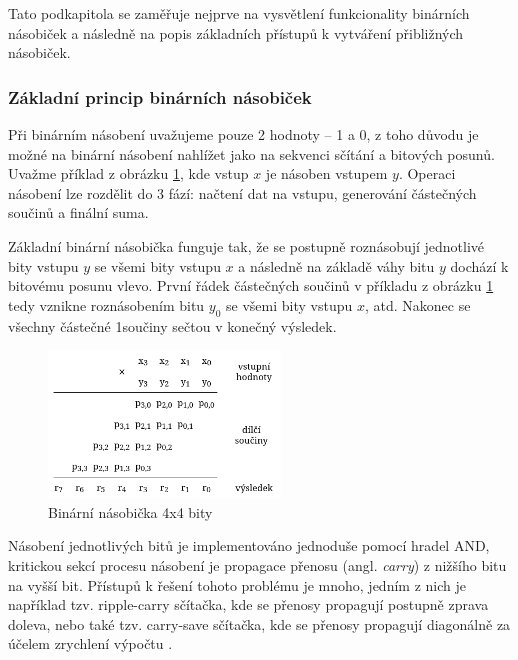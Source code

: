 Tato podkapitola se zaměřuje nejprve na vysvětlení funkcionality binárních násobiček a následně na popis základních přístupů k vytváření přibližných násobiček.

\subsubsection{Základní princip binárních násobiček}
Při binárním násobení uvažujeme pouze 2 hodnoty -- 1 a 0, z toho důvodu je možné na binární násobení nahlížet jako na sekvenci sčítání a bitových posunů. Uvažme příklad z obrázku \ref{fig:binmult}, kde vstup $x$ je násoben vstupem $y$. Operaci násobení lze rozdělit do 3 fází: načtení dat na vstupu, generování částečných součinů a finální suma.

Základní binární násobička funguje tak, že se postupně roznásobují jednotlivé bity vstupu $y$ se všemi bity vstupu $x$ a následně na základě váhy bitu $y$ dochází k bitovému posunu vlevo. První řádek částečných součinů v příkladu z obrázku \ref{fig:binmult} tedy vznikne roznásobením bitu $y_0$ se všemi bity vstupu $x$, atd. Nakonec se všechny částečné 1součiny sečtou v konečný výsledek.

\begin{figure}[H]
    \centering
    \includegraphics[width=0.55\textwidth]{obrazky-figures/binmult.png}
    \caption{Binární násobička 4x4 bity}
    \label{fig:binmult}
\end{figure}

Násobení jednotlivých bitů je implementováno jednoduše pomocí hradel AND, kritickou sekcí procesu násobení je propagace přenosu (angl. \textit{carry}) z nižšího bitu na vyšší bit. Přístupů k řešení tohoto problému je mnoho, jedním z nich je například tzv. ripple-carry sčítačka, kde se přenosy propagují postupně zprava doleva, nebo také tzv. carry-save sčítačka, kde se přenosy propagují diagonálně za účelem zrychlení výpočtu \cite{approx_mult_survey}.


